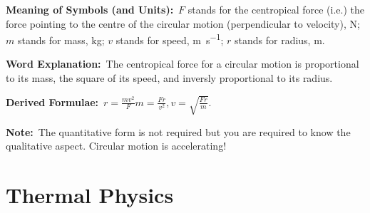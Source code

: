 \documentclass[8pt]{article}
\newcommand{\MeanSymb}{\textbf{Meaning of Symbols (and Units):}\ }
\newcommand{\WordExpl}{\textbf{Word Explanation:}\ }
\newcommand{\DeriForm}{\textbf{Derived Formulae:}\ }
\newcommand{\Note}{\textbf{Note:}\ }
\begin{document}
\begin{enumerate}
                \MeanSymb \(F\) stands for the centropical force (i.e.) the force pointing to the centre of the circular motion (perpendicular to velocity), \unit{\newton}; \(m\) stands for mass, \unit{\kilogram}; \(v\) stands for speed, \unit{\metre\per\second}; \(r\) stands for radius, \unit{\metre}.

                \WordExpl The centropical force for a circular motion is proportional to its mass, the square of its speed, and inversly proportional to its radius.

                \DeriForm \(r = \frac{mv^2}{F} m = \frac{Fr}{v^2}, v = \sqrt{\frac{Fr}{m}}\).

                \Note The quantitative form is not required but you are required to know the qualitative aspect. Circular motion is accelerating!
            \end{enumerate}

    \section{Thermal Physics}
\end{document}
